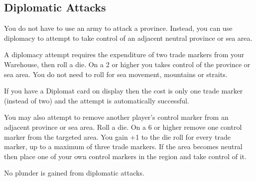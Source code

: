 \subsection{Diplomatic Attacks}

You do not have to use an army to attack a province. Instead, you can use diplomacy to attempt to take control of an adjacent neutral province or sea area.

A diplomacy attempt requires the expenditure of two trade markers from your Warehouse, then roll a die. On a 2 or higher you takes control of the province or sea area. You do not need to roll for sea movement, mountains or straits.

If you have a Diplomat card on display then the cost is only one trade marker (instead of two) and the attempt is automatically successful.

You may also attempt to remove another player’s control marker from an adjacent province or sea area. Roll a die. On a 6 or higher remove one control marker from the targeted area. You gain +1 to the die roll for every trade marker, up to a maximum of three trade markers. If the area becomes neutral then place one of your own control markers in the region and take control of it.

No plunder is gained from diplomatic attacks.
